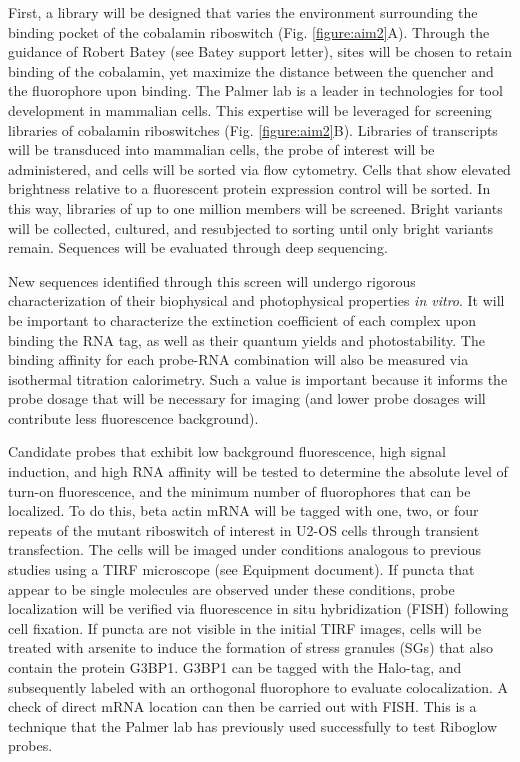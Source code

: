 First, a library will be designed that varies the environment surrounding the binding pocket of the cobalamin riboswitch (Fig. \ref{figure:aim2}A). Through the guidance of Robert Batey (see Batey support letter), sites will be chosen to retain binding of the cobalamin, yet maximize the distance between the quencher and the fluorophore upon binding\cite{JohnsonJrB12cofactorsdirectly2012}.
The Palmer lab is a leader in technologies for tool development in mammalian cells\cite{FiedlerDropletMicrofluidicFlow2017,DeanHighSpeedMultiparameterPhotophysical2015}.
This expertise will be leveraged for screening libraries of cobalamin riboswitches (Fig. \ref{figure:aim2}B). Libraries of transcripts will be transduced into mammalian cells, the probe of interest will be administered, and cells will be sorted via flow cytometry. Cells that show elevated brightness relative to a fluorescent protein expression control will be sorted.
In this way, libraries of up to one million members will be screened. Bright variants will be collected, cultured, and resubjected to sorting until only bright variants remain. Sequences will be evaluated through deep sequencing.

New sequences identified through this screen will undergo rigorous characterization of their biophysical and photophysical properties \textit{in vitro}. It will be important to characterize the extinction coefficient of each complex upon binding the RNA tag, as well as their quantum yields and photostability. The binding affinity for each probe-RNA combination will also be measured via isothermal titration calorimetry. Such a value is important because it informs the probe dosage that will be necessary for imaging (and lower probe dosages will contribute less fluorescence background).

Candidate probes that exhibit low background fluorescence, high signal induction, and high RNA affinity will be tested to determine the absolute level of turn-on fluorescence, and the minimum number of fluorophores that can be localized. To do this, beta actin mRNA will be tagged with one, two, or four repeats of the mutant riboswitch of interest in U2-OS cells through transient transfection. The cells will be imaged under conditions analogous to previous studies\cite{KatzMappingtranslationhotspots2016} using a TIRF microscope (see Equipment document). If puncta that appear to be single molecules are observed under these conditions, probe localization will be verified via fluorescence in situ hybridization (FISH) following cell fixation. If puncta are not visible in the initial TIRF images, cells will be treated with arsenite to induce the formation of stress granules (SGs) that also contain the protein G3BP1\cite{ZurlaCharacterizingmRNAInteractions2011,JainATPaseModulatedStressGranules2016,NellesProgrammableRNATracking2016}.
G3BP1 can be tagged with the Halo-tag, and subsequently labeled with an orthogonal fluorophore to evaluate colocalization. A check of direct mRNA location can then be carried out with FISH.
This is a technique that the Palmer lab has previously used successfully to test Riboglow probes\cite{BraselmannDevelopmentriboswitchbasedplatform2017}.

